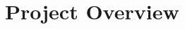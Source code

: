 \section{Project Overview}

\citep{davison2003real}
\citep{klein2007parallel}
\citep{newcombe2010live}
\citep{pollefeys2008detailed}

